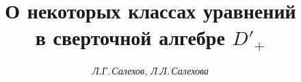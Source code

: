 




%





\newcommand{\const}{\operatorname{const}}


\newcommand{\tts}[1]{}







\setcounter{page}{75}















\author{\it Л.Г.\,Салехов, Л.Л.\,Салехова}




\title{О некоторых классах уравнений\\ в сверточной алгебре $D'_+$}





\date{}




\pagestyle{plain} %







\maketitle


\label{begin}









